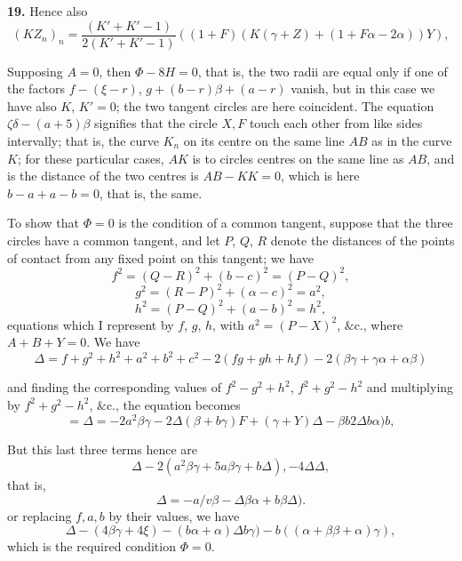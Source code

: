 \documentclass[11pt,a4paper]{book}
\begin{document}
\textbf{19.} Hence also
\[
(KZ_n)_n = \frac{(K' + K' - 1)}{2(K' + K' - 1)}((1 + F)(K(\gamma + Z) + (1 + F\alpha - 2\alpha))Y),
\]

Supposing $A = 0$, then $\Phi - 8H = 0$, that is, the two radii are equal only if one of the factors $f - (\xi - r)$, $g + (b - r)\beta + (a - r)$ vanish, but in this case we have also $K$, $K' = 0$; the two tangent circles are here coincident. The equation $\zeta\delta - (a + 5)\beta$ signifies that the circle $X, F$ touch each other from like sides intervally; that is, the curve $K_n$ on its centre on the same line $A B$ as in the curve $K$; for these particular cases, $A K$ is to circles centres on the same line as $A B$, and is the distance of the two centres is $A B - K K = 0$, which is here $b - a + a - b = 0$, that is, the same.

To show that $\Phi = 0$ is the condition of a common tangent, suppose that the three circles have a common tangent, and let $P$, $Q$, $R$ denote the distances of the points of contact from any fixed point on this tangent; we have
\[
f^2 = (Q - R)^2 + (b - c)^2 = (P - Q)^2,
\]
\[
g^2 = (R - P)^2 + (\alpha - c)^2 = a^2,
\]
\[
h^2 = (P - Q)^2 + (a - b)^2 = h^2,
\]
equations which I represent by $f$, $g$, $h$, with $a^2 = (P - X)^2$, $\&\text{c.}$, where $A + B + Y = 0$. We have
\[
\Delta = f + g^2 + h^2 + a^2 + b^2 + c^2 - 2(fg + gh + hf) - 2(\beta \gamma + \gamma\alpha + \alpha\beta)
\]

and finding the corresponding values of $f^2 - g^2 + h^2$, $f^2 + g^2 - h^2$ and multiplying by $f^2 + g^2 - h^2$, $\&\text{c.}$, the equation becomes
\[
= \Delta = - 2a^2\beta \gamma - 2\Delta(\beta + b\gamma)F + (\gamma + Y)\Delta - \beta b 2\Delta b\alpha)b,
\]

But this last three terms hence are
\[
\Delta - 2(a^2\beta\gamma + 5a\beta\gamma + b\Delta), - 4\Delta\Delta,
\]
that is,
\[
\Delta = -a/v\beta - \Delta\beta\alpha + b\beta\Delta).
\]
or replacing $f, a, b$ by their values, we have
\[
\Delta - (4\beta\gamma + 4\xi) - (b\alpha + \alpha)\Delta b\gamma) - b((\alpha + \beta\beta + \alpha)\gamma),
\]
which is the required condition $\Phi = 0$.
\end{document}
